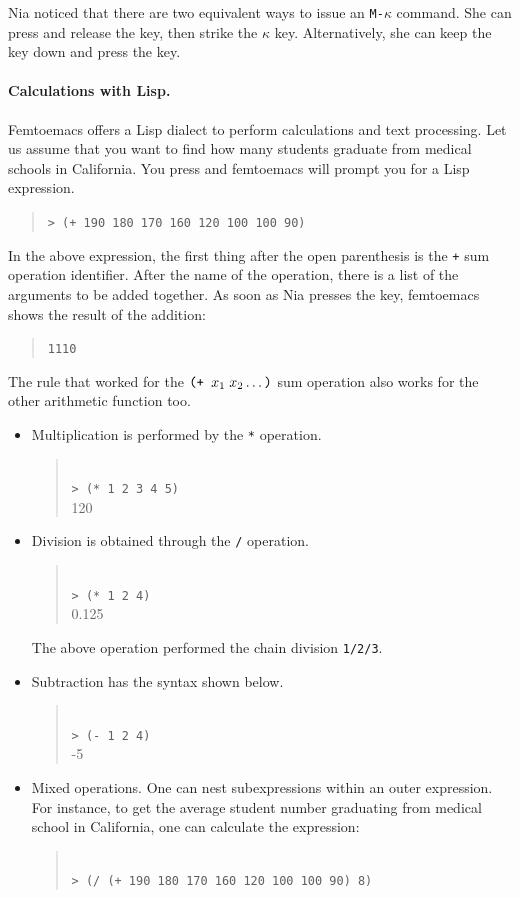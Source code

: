 \documentclass[a4paper,12pt]{book}
\begin{document}
Nia noticed that there are two equivalent ways to
issue an \verb|M-|$\kappa$ command. She can
press and release the  key, then
strike the  $\kappa$ key. Alternatively, she
can keep the  key down and press
the \keys{$\kappa$} key.

\paragraph{Calculations with Lisp.} Femtoemacs
offers a Lisp dialect to perform calculations
and text processing. Let us assume that you
want to find how many students graduate
from medical schools in California. You
press \keys{;} and femtoemacs
will prompt you for a Lisp expression.
\begin{quote}
\verb|> (+ 190 180 170 160 120 100 100 90)|
\end{quote}
In the above expression, the first thing after
the open parenthesis is the \verb|+| sum
operation identifier. After the name of
the operation, there is a list of
the arguments to be added together.
As soon as Nia presses the  key,
femtoemacs shows the result of the addition:
\begin{quote}
\verb|1110|
\end{quote}
The rule that worked for 
the $\verb|(+ | x_1\;x_2\ldots\verb|)|$
sum operation also works for the 
other arithmetic function too.
\begin{itemize}
  \item{Multiplication} is performed
by the \verb|*| operation.
\begin{quote}
\keys{;}\\
\verb|> (* 1 2 3 4 5)|\\
120
\end{quote}
\item{Division} is obtained through the \verb|/| operation.
\begin{quote}
\keys{;}\\
\verb|> (* 1 2 4)|\\
0.125
\end{quote}
The above operation performed the chain
division \verb|1/2/3|.
\item{Subtraction} has the syntax shown below.
\begin{quote}
\keys{;}\\
\verb|> (- 1 2 4)|\\
-5
\end{quote}
\item Mixed operations. One can nest subexpressions
  within an outer expression. For instance,
  to get the average student number graduating
  from medical school in California, one can
  calculate the expression:
\begin{quote}
\keys{;}\\
\verb|> (/ (+ 190 180 170 160 120 100 100 90) 8)|
\end{quote}

\end{itemize}
\end{document}
